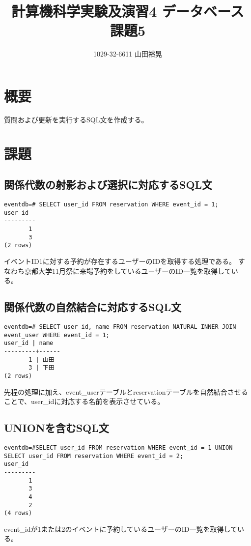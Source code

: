 \documentclass[dvipdfmx]{jarticle}
\begin{document}
\title{計算機科学実験及演習4 データベース 課題5}
\author{1029-32-6611 山田裕晃}
\maketitle

\section{概要}
質問および更新を実行するSQL文を作成する。

\section{課題}
\subsection{関係代数の射影および選択に対応するSQL文}
\begin{lstlisting}
eventdb=# SELECT user_id FROM reservation WHERE event_id = 1;
user_id
---------
       1
       3
(2 rows)
\end{lstlisting}
イベントID1に対する予約が存在するユーザーのIDを取得する処理である。
すなわち京都大学11月祭に来場予約をしているユーザーのID一覧を取得している。

\subsection{関係代数の自然結合に対応するSQL文}
\begin{lstlisting}
eventdb=# SELECT user_id, name FROM reservation NATURAL INNER JOIN event_user WHERE event_id = 1;
user_id | name
---------+------
       1 | 山田
       3 | 下田
(2 rows)
\end{lstlisting}
先程の処理に加え、event\_userテーブルとreservationテーブルを自然結合させることで、user\_idに対応する名前を表示させている。

\subsection{UNIONを含むSQL文}
\begin{lstlisting}
eventdb=#SELECT user_id FROM reservation WHERE event_id = 1 UNION SELECT user_id FROM reservation WHERE event_id = 2;
user_id
---------
       1
       3
       4
       2
(4 rows)
\end{lstlisting}
event\_idが1または2のイベントに予約しているユーザーのID一覧を取得している。
\end{document}
